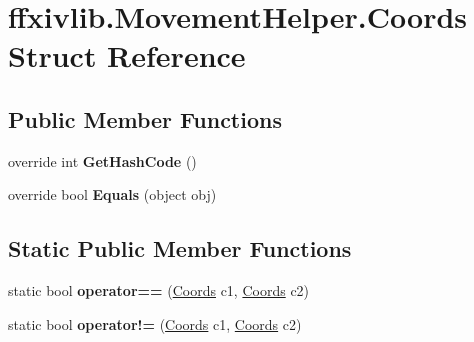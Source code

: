 \hypertarget{structffxivlib_1_1_movement_helper_1_1_coords}{\section{ffxivlib.\-Movement\-Helper.\-Coords Struct Reference}
\label{structffxivlib_1_1_movement_helper_1_1_coords}
}
\subsection*{Public Member Functions}
\begin{DoxyCompactItemize}
\item 
\hypertarget{structffxivlib_1_1_movement_helper_1_1_coords_adad09593a78c0b7d5a9ee09971b210fa}{override int {\bfseries Get\-Hash\-Code} ()}\label{structffxivlib_1_1_movement_helper_1_1_coords_adad09593a78c0b7d5a9ee09971b210fa}

\item 
\hypertarget{structffxivlib_1_1_movement_helper_1_1_coords_a7dc9de9f64cf67eb9a9a85f39fcf7cbe}{override bool {\bfseries Equals} (object obj)}\label{structffxivlib_1_1_movement_helper_1_1_coords_a7dc9de9f64cf67eb9a9a85f39fcf7cbe}

\end{DoxyCompactItemize}
\subsection*{Static Public Member Functions}
\begin{DoxyCompactItemize}
\item 
\hypertarget{structffxivlib_1_1_movement_helper_1_1_coords_a9110bb3fcc8da6f4f738489558246a3e}{static bool {\bfseries operator==} (\hyperlink{structffxivlib_1_1_movement_helper_1_1_coords}{Coords} c1, \hyperlink{structffxivlib_1_1_movement_helper_1_1_coords}{Coords} c2)}\label{structffxivlib_1_1_movement_helper_1_1_coords_a9110bb3fcc8da6f4f738489558246a3e}

\item 
\hypertarget{structffxivlib_1_1_movement_helper_1_1_coords_a7494269283a73f89dce60dc3af9ca611}{static bool {\bfseries operator!=} (\hyperlink{structffxivlib_1_1_movement_helper_1_1_coords}{Coords} c1, \hyperlink{structffxivlib_1_1_movement_helper_1_1_coords}{Coords} c2)}\label{structffxivlib_1_1_movement_helper_1_1_coords_a7494269283a73f89dce60dc3af9ca611}

\end{DoxyCompactItemize}
